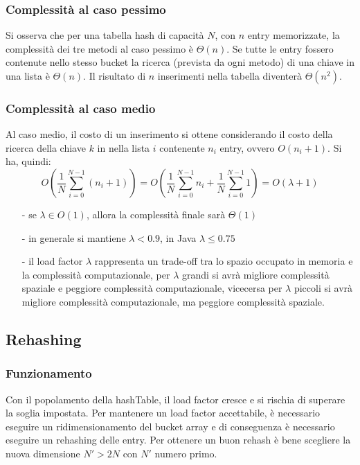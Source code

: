 \documentclass[a4paper]{article}
\begin{document}
\subsubsection*{Complessità al caso pessimo}
Si osserva che per una tabella hash di capacità \(N\), con \(n\) entry memorizzate, la complessità dei tre metodi al caso pessimo
è \(\Theta(n)\). Se tutte le entry fossero contenute nello stesso bucket la ricerca (prevista da ogni metodo) di una chiave in una
lista è \(\Theta(n)\). Il risultato di \(n\) inserimenti nella tabella diventerà \(\Theta(n^2)\).

\subsubsection*{Complessità al caso medio}
Al caso medio, il costo di un inserimento si ottene considerando il costo della ricerca della chiave \(k\) in nella lista \(i\)
contenente \(n_i\) entry, ovvero \(O(n_i + 1)\). Si ha, quindi:
\[O\left(\frac{1}{N} \sum_{i=0}^{N-1} (n_i + 1)\right) = O\left(\frac{1}{N} \sum_{i=0}^{N-1} n_i + \frac{1}{N} \sum_{i=0}^{N-1} 1\right) = O(\lambda + 1)\]
\begin{itemize}[topsep=3pt, itemsep=0pt]
	\item[-] se \(\lambda \in O(1)\), allora la complessità finale sarà \(\Theta(1)\)
	\item[-] in generale si mantiene \(\lambda < 0.9\), in Java \(\lambda \leq 0.75\)
	\item[-] il load factor \(\lambda\) rappresenta un trade-off tra lo spazio occupato in memoria e la complessità computazionale,
	per \(\lambda\) grandi si avrà migliore complessità spaziale e peggiore complessità computazionale, vicecersa per \(\lambda\)
	piccoli si avrà migliore complessità computazionale, ma peggiore complessità spaziale.
\end{itemize}

\subsection{Rehashing}
\subsubsection*{Funzionamento}
Con il popolamento della hashTable, il load factor cresce e si rischia di superare la soglia impostata. Per mantenere un load
factor accettabile, è necessario eseguire un ridimensionamento del bucket array e di conseguenza è necessario eseguire un rehashing
delle entry. Per ottenere un buon rehash è bene scegliere la nuova dimensione \(N' > 2N\) con \(N'\) numero primo.
\end{document}
